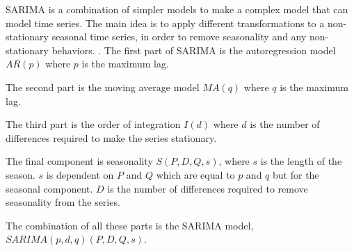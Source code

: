SARIMA is a combination of simpler models to make a complex model that can model time series.
The main idea is to apply different transformations to a non-stationary seasonal time series,
in order to remove seasonality and any non-stationary behaviors.
\citet[p. 327-385]{Utlaut2008}.
The first part of SARIMA is the autoregression model
$AR(p)$ where $p$ is the maximum lag.

The second part is the moving average model $MA(q)$ where $q$ is the maximum lag.

The third part is the order of integration $I(d)$ where $d$ is the number of
differences required to make the series stationary.

The final component is seasonality $S(P, D, Q, s)$, where $s$ is the length
of the season.
$s$ is dependent on $P$ and $Q$ which are equal to $p$ and $q$ but for the seasonal component.
$D$ is the number of differences required to remove seasonality from the series.

The combination of all these parts is the SARIMA model,
$SARIMA(p, d, q)(P, D, Q, s)$.

